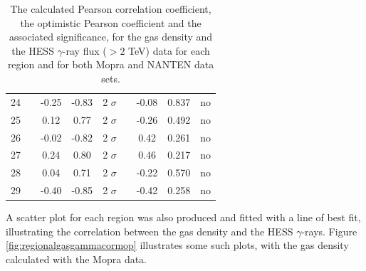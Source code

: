\documentclass[12pt,a4paper]{article}
\begin{document}
\begin{table}[H]
\begin{tabular}{ccccccccc}
		24 && -0.25 & -0.83 & 2 $\sigma$ && -0.08 & 0.837 & no \\
		25 && 0.12 & 0.77 & 2 $\sigma$ && -0.26 & 0.492 & no \\
		26 && -0.02 & -0.82 & 2 $\sigma$ && 0.42 & 0.261 & no \\ 
		27 && 0.24 & 0.80 & 2 $\sigma$ && 0.46 & 0.217 & no \\
		28 && 0.04 & 0.71 & 2 $\sigma$ && -0.22 & 0.570 & no \\
		29 && -0.40 & -0.85 & 2 $\sigma$ && -0.42 & 0.258 & no \\
		\hline 
	\end{tabular} 
	\caption{The calculated Pearson correlation coefficient, the optimistic Pearson coefficient and the associated significance, for the gas density and the HESS $\gamma$-ray flux ($> 2$ TeV) data for each region and for both Mopra and NANTEN data sets.}
	\label{tab:gasgammacor}
\end{table}

A scatter plot for each region was also produced and fitted with a line of best fit, illustrating the correlation between the gas density and the HESS $\gamma$-rays. 
Figure \ref{fig:regionalgasgammacormop} illustrates some such plots, with the gas density calculated with the Mopra data. 
\end{document}
